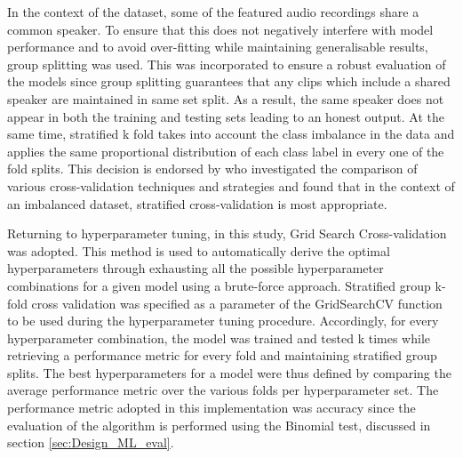 \documentclass{l4proj}
\begin{document}
In the context of the dataset, some of the featured audio recordings share a common speaker. To ensure that this does not negatively interfere with model performance and to avoid over-fitting while maintaining generalisable results, group splitting was used. This was incorporated to ensure a robust evaluation of the models since group splitting guarantees that any clips which include a shared speaker are maintained in same set split. As a result, the same speaker does not appear in both the training and testing sets leading to an honest output.
At the same time, stratified k fold takes into account the class imbalance in the data and applies the same proportional distribution of each class label in every one of the fold splits. This decision is endorsed by \citep{fontanari2022cross} who investigated the comparison of various cross-validation techniques and strategies and found that in the context of an imbalanced dataset, stratified cross-validation is most appropriate.

Returning to hyperparameter tuning, in this study, Grid Search Cross-validation was adopted. This method is used to automatically derive the optimal hyperparameters through exhausting all the possible hyperparameter combinations for a given model using a brute-force approach. Stratified group k-fold cross validation was specified as a parameter of the GridSearchCV function to be used during the hyperparameter tuning procedure. Accordingly, for every hyperparameter combination, the model was trained and tested k times while retrieving a performance metric for every fold and maintaining stratified group splits. The best hyperparameters for a model were thus defined by comparing the average performance metric over the various folds per hyperparameter set.
The performance metric adopted in this implementation was accuracy since the evaluation of the algorithm is performed using the Binomial test, discussed in section \ref{sec:Design_ML_eval}. 
\end{document}
